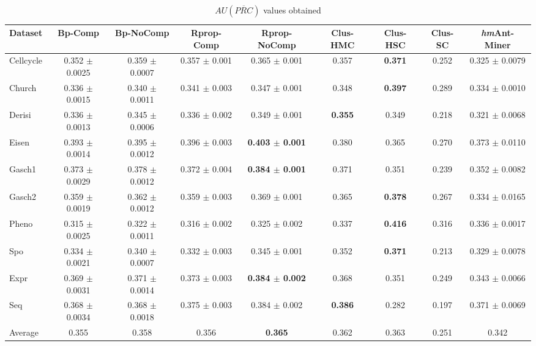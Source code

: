 \begin{table*}[ht]
\scriptsize
\centering
\setlength{\tabcolsep}{3pt}
\caption{$AU(\overline{PRC})$ values obtained}
\begin{tabular*}{\textwidth}
    {@{\extracolsep{\fill}}lcccccccc}
\toprule
Dataset & Bp-Comp  & Bp-NoComp & Rprop-Comp & Rprop-NoComp & Clus-HMC & Clus-HSC & Clus-SC & {\it hm}Ant-Miner \\ 
\midrule
 
Cellcycle & 0.352 $\pm$ 0.0025 & 0.359 $\pm$ 0.0007 & 0.357 $\pm$ 0.001 & 0.365 $\pm$ 0.001 & 0.357 & {\bf 0.371} & 0.252 & 0.325 $\pm$ 0.0079\\

Church  & 0.336 $\pm$ 0.0015 & 0.340 $\pm$ 0.0011 & 0.341 $\pm$ 0.003 & 0.347 $\pm$ 0.001 & 0.348 & {\bf 0.397} & 0.289 & 0.334 $\pm$ 0.0010\\

Derisi    & 0.336 $\pm$ 0.0013 & 0.345 $\pm$ 0.0006 & 0.336 $\pm$ 0.002 & 0.349 $\pm$ 0.001 & {\bf 0.355} & 0.349 & 0.218 & 0.321 $\pm$ 0.0068\\

Eisen     & 0.393 $\pm$ 0.0014 & 0.395 $\pm$ 0.0012 & 0.396 $\pm$ 0.003 & {\bf 0.403 $\pm$ 0.001} & 0.380 & 0.365 & 0.270 & 0.373 $\pm$ 0.0110\\

Gasch1  & 0.373 $\pm$ 0.0029 & 0.378 $\pm$ 0.0012 & 0.372 $\pm$ 0.004 & {\bf 0.384 $\pm$ 0.001} & 0.371 & 0.351 & 0.239 & 0.352 $\pm$ 0.0082\\

Gasch2  & 0.359 $\pm$ 0.0019 & 0.362 $\pm$ 0.0012 & 0.359 $\pm$ 0.003 & 0.369 $\pm$ 0.001 & 0.365 & {\bf 0.378} & 0.267 & 0.334 $\pm$ 0.0165\\

Pheno    & 0.315 $\pm$ 0.0025 & 0.322 $\pm$ 0.0011 & 0.316 $\pm$ 0.002 & 0.325 $\pm$ 0.002 & 0.337 & {\bf 0.416} & 0.316 & 0.336 $\pm$ 0.0017\\

Spo        & 0.334 $\pm$ 0.0021 & 0.340 $\pm$ 0.0007 & 0.332 $\pm$ 0.003 & 0.345 $\pm$ 0.001 & 0.352 & {\bf 0.371} & 0.213 & 0.329 $\pm$ 0.0078\\

Expr       & 0.369 $\pm$ 0.0031 & 0.371 $\pm$ 0.0014 & 0.373 $\pm$ 0.003 & {\bf 0.384 $\pm$ 0.002} & 0.368 & 0.351 & 0.249 & 0.343 $\pm$ 0.0066\\

Seq        & 0.368 $\pm$ 0.0034 & 0.368 $\pm$ 0.0018 & 0.375 $\pm$ 0.003 & 0.384 $\pm$ 0.002 & {\bf 0.386} & 0.282 & 0.197 & 0.371 $\pm$ 0.0069\\

\midrule
Average & 0.355 & 0.358 & 0.356 & {\bf 0.365} & 0.362 & 0.363 & 0.251 & 0.342           \\ 
\bottomrule
\end{tabular*}
\label{tab:prcurves}
\end{table*}

